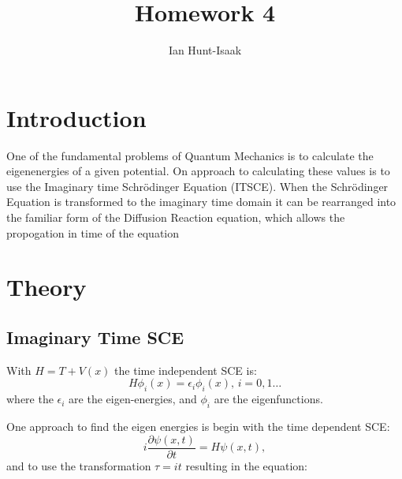\documentclass[]{article}
\title{Homework 4}
\author{Ian Hunt-Isaak}
\date{}
\begin{document}
\maketitle


\section{Introduction}
One of the fundamental problems of Quantum Mechanics is to calculate the eigenenergies of a given potential. On approach to calculating these values is to use the Imaginary time Schrödinger Equation (ITSCE). When the Schrödinger Equation is transformed to the imaginary time domain it can be rearranged into the familiar form of the Diffusion Reaction equation, which allows the propogation in time of the equation 
\section{Theory}
\subsection{Imaginary Time SCE}
With $H = T + V(x)$ the time independent SCE is:
\begin{equation}
H \phi_i(x) = \epsilon_i\phi_i(x)\text{, }i=0,1\dots
\end{equation}
where the $\epsilon_i$ are the eigen-energies, and $\phi_i$ are the eigenfunctions. 

One approach to find the eigen energies is begin with the time dependent SCE:
\begin{equation}
i\frac{\partial\psi(x,t)}{\partial t} = H\psi(x,t),
\end{equation}
and to use the transformation $\tau = i t$ resulting in the equation:
\end{document}
